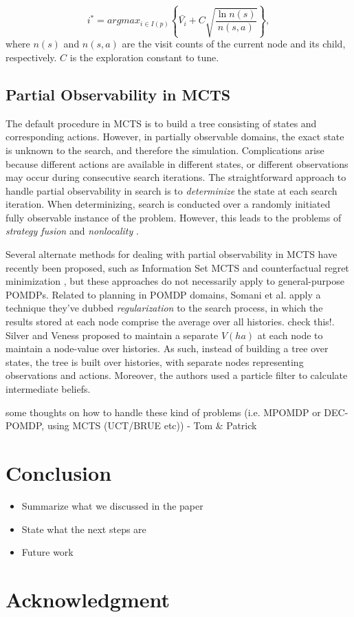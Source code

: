 \documentclass[conference]{IEEEtran}
\begin{document}
\begin{equation}
\label{eq:uct}
i^* = argmax_{i \in I(p)}\left\{ \bar{V_i} + C \sqrt{ \frac{\ln{n(s)}}{n(s, a)}}\right\},
\end{equation}
where $n(s)$ and $n(s, a)$ are the visit counts of the current node and its child, respectively. $C$ is the exploration constant to tune.  

\subsection{Partial Observability in MCTS}
\label{sub:pomcts}

The default procedure in MCTS is to build a tree consisting of states and corresponding actions. However, in partially observable domains, the exact state is unknown to the search, and therefore the simulation. Complications arise because different actions are available in different states, or different observations may occur during consecutive search iterations. The straightforward approach to handle partial observability in search is to \emph{determinize} the state at each search iteration. When determinizing, search is conducted over a randomly initiated fully observable instance of the problem. However, this leads to the problems of \emph{strategy fusion} and \emph{nonlocality} \cite{cowling2012information}.

Several alternate methods for dealing with partial observability in MCTS have recently been proposed, such as Information Set MCTS and counterfactual regret minimization \cite{cowling2012information,Lisy15Online}, but these approaches do not necessarily apply to general-purpose POMDPs. Related to planning in POMDP domains, Somani et al. \cite{somani2013despot} apply a technique they've dubbed {\it regularization} to the search process, in which the results stored at each node comprise the average over all histories. {\red check this!}. Silver and Veness \cite{silver2010monte} proposed to maintain a separate $V(ha)$ at each node to maintain a node-value over histories. As such, instead of building a tree over states, the tree is built over histories, with separate nodes representing observations and actions. Moreover, the authors used a particle filter to calculate intermediate beliefs.

{\red some thoughts on how to handle these kind of problems (i.e. MPOMDP or DEC-POMDP, using MCTS (UCT/BRUE etc)) - Tom \& Patrick}

\section{Conclusion}
\begin{itemize}
\item Summarize what we discussed in the paper
\item State what the next steps are
\item Future work
\end{itemize}

\section*{Acknowledgment}




\end{document}

